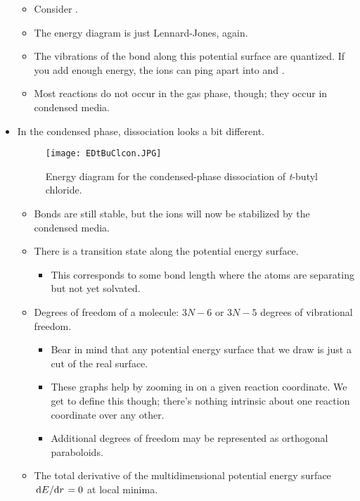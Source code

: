 \documentclass[../notes.tex]{subfiles}
\begin{document}
\begin{itemize}
    \begin{itemize}
        \item Consider .
        \item The energy diagram is just Lennard-Jones, again.
        \item The vibrations of the  bond along this potential surface are quantized. If you add enough energy, the ions can ping apart into  and .
        \item Most reactions do not occur in the gas phase, though; they occur in condensed media.
    \end{itemize}
    \item In the condensed phase, dissociation looks a bit different.
    \begin{figure}[h!]
        \centering
        \texttt{[image: EDtBuClcon.JPG]}
        \caption{Energy diagram for the condensed-phase dissociation of \emph{t}-butyl chloride.}
        \label{fig:EDtBuClcon}
    \end{figure}
    \begin{itemize}
        \item Bonds are still stable, but the ions will now be stabilized by the condensed media.
        \item There is a transition state along the potential energy surface.
        \begin{itemize}
            \item This corresponds to some bond length where the atoms are separating but not yet solvated.
        \end{itemize}
        \item Degrees of freedom of a molecule: $3N-6$ or $3N-5$ degrees of vibrational freedom.
        \begin{itemize}
            \item Bear in mind that any potential energy surface that we draw is just a cut of the real surface.
            \item These graphs help by zooming in on a given reaction coordinate. We get to define this though; there's nothing intrinsic about one reaction coordinate over any other.
            \item Additional degrees of freedom may be represented as orthogonal paraboloids.
        \end{itemize}
        \item The total derivative of the multidimensional potential energy surface $\dv*{E}{r}=0$ at local minima.

\end{itemize}
\end{itemize}
\end{document}
